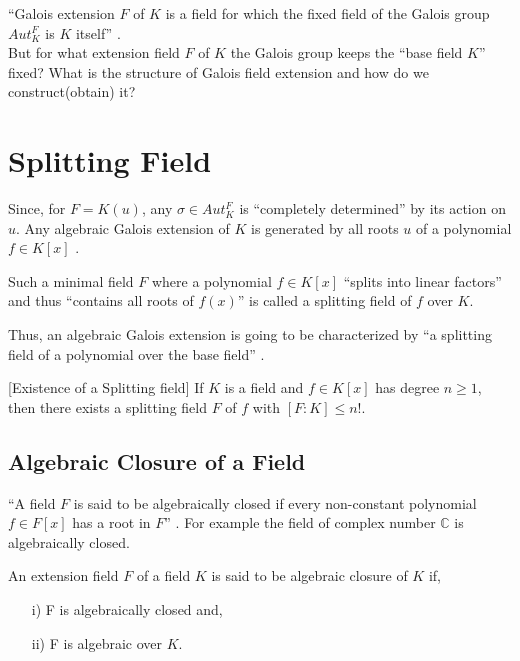 ``Galois extension \(F\) of  \(K\) is a field for which the fixed field of the Galois group \(Aut_K^F\) is \(K\) itself'' \cite{hunger}.\\
But for what extension field \(F\) of \(K\) the Galois group keeps the ``base field \(K\)'' fixed? What is the structure of Galois field extension and how do we construct(obtain) it?


\section{Splitting Field}
Since, for \(F=K(u)\), any \(\sigma \in Aut_K^F\) is ``completely determined'' \cite{hunger} by its action on \(u\). Any algebraic Galois extension of \(K\) is generated by all roots \(u\) of a polynomial \(f \in K[x]\) \cite{hunger}.

\begin{definition} \cite{hunger}
  Such a minimal field \(F\) where a polynomial \(f \in K[x]\) ``splits into linear factors'' and thus ``contains all roots of \(f(x)\)'' is called a splitting field of \(f\) over \(K\).
\end{definition}
Thus, an algebraic Galois extension is going to be characterized by ``a splitting field of a polynomial over the base field'' \cite{hunger}.
\vspace{3mm}

\begin{theorem} \cite{hunger} [Existence of a Splitting field]
  If \(K\) is a field and \(f \in K[x]\) has degree \(n \geq 1\), then there exists a splitting field \(F\) of \(f\) with \([F:K] \leq n!\).
  \end{theorem}

\subsection{Algebraic Closure of a Field}
``A field \(F\) is said to be algebraically closed if every non-constant polynomial \(f \in F[x]\) has a root in \(F\)'' \cite{hunger}.
For example the field of complex number \(\mathbb{C}\) is algebraically closed.\\[3mm]

\begin{definition} \cite{hunger}
An extension field \(F\) of a field \(K\) is said to be algebraic closure of \(K\) if,
\begin{enumerate}
\item[i)] F is algebraically closed and,
  \item[ii)] F is algebraic over \(K\).
  \end{enumerate}
\end{definition}


